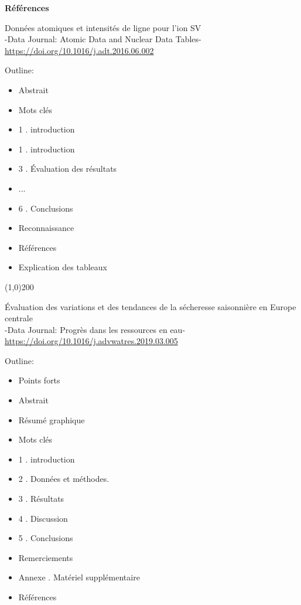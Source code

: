\documentclass[11pt,oneside]{article}
\begin{document}
\begin{flushleft}
\textbf{Références}
\end{flushleft}

\newpage

 
\twocolumn
\setlength{\columnseprule}{0.01cm}
\begin{center}
Données atomiques et intensités de ligne pour l'ion SV
\\
-Data Journal: Atomic Data and Nuclear Data Tables-\\
\url {https://doi.org/10.1016/j.adt.2016.06.002}
\end{center}

\noindent Outline:
\begin{itemize}
\item Abstrait
\item Mots clés
\item 1 . introduction
\item 1 . introduction
\item 3 . Évaluation des résultats
\item ...
\item 6 . Conclusions
\item Reconnaissance
\item Références
\item Explication des tableaux
\end{itemize}

\line (1,0){200}

\begin{center}
Évaluation des variations et des tendances de la sécheresse saisonnière en Europe centrale\\
-Data Journal: Progrès dans les ressources en eau-\\
\url {https://doi.org/10.1016/j.advwatres.2019.03.005}
\end{center}
\noindent Outline:
\begin{itemize}
\item Points forts
\item Abstrait
\item Résumé graphique
\item Mots clés 
\item 1 . introduction  
\item 2 . Données et méthodes. 
\item 3 . Résultats
\item 4 . Discussion
\item 5 . Conclusions
\item Remerciements
\item Annexe . Matériel supplémentaire
\item Références
\end{itemize}
\end{document}
